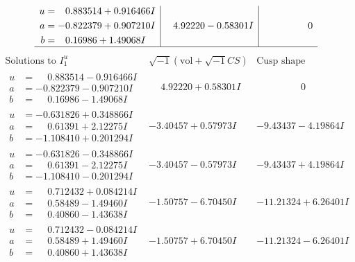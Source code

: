 \documentclass[1p]{elsarticle_modified}
\theoremstyle{definition}
\newcommand{\I}{\sqrt{-1}}
\begin{document}
$$\begin{array}{c|c|c}
\begin{aligned}
u &= \phantom{-}0.883514 + 0.916466 I \\
a &= -0.822379 + 0.907210 I \\
b &= \phantom{-}0.16986 + 1.49068 I\end{aligned}
 & \phantom{-}4.92220 - 0.58301 I & \phantom{-0.000000 } 0\\
 \hline 
 \end{array}$$\newpage$$\begin{array}{c|c|c}  
\text{Solutions to }I^u_{1}& \I (\text{vol} + \sqrt{-1}CS) & \text{Cusp shape}\\
 \hline 
\begin{aligned}
u &= \phantom{-}0.883514 - 0.916466 I \\
a &= -0.822379 - 0.907210 I \\
b &= \phantom{-}0.16986 - 1.49068 I\end{aligned}
 & \phantom{-}4.92220 + 0.58301 I & \phantom{-0.000000 } 0 \\ \hline\begin{aligned}
u &= -0.631826 + 0.348866 I \\
a &= \phantom{-}0.61391 + 2.12275 I \\
b &= -1.108410 + 0.201294 I\end{aligned}
 & -3.40457 + 0.57973 I & -9.43437 - 4.19864 I \\ \hline\begin{aligned}
u &= -0.631826 - 0.348866 I \\
a &= \phantom{-}0.61391 - 2.12275 I \\
b &= -1.108410 - 0.201294 I\end{aligned}
 & -3.40457 - 0.57973 I & -9.43437 + 4.19864 I \\ \hline\begin{aligned}
u &= \phantom{-}0.712432 + 0.084214 I \\
a &= \phantom{-}0.58489 - 1.49460 I \\
b &= \phantom{-}0.40860 - 1.43638 I\end{aligned}
 & -1.50757 - 6.70450 I & -11.21324 + 6.26401 I \\ \hline\begin{aligned}
u &= \phantom{-}0.712432 - 0.084214 I \\
a &= \phantom{-}0.58489 + 1.49460 I \\
b &= \phantom{-}0.40860 + 1.43638 I\end{aligned}
 & -1.50757 + 6.70450 I & -11.21324 - 6.26401 I \\ \hline\begin{aligned}

\end{aligned}
\end{array}$$
\end{document}
